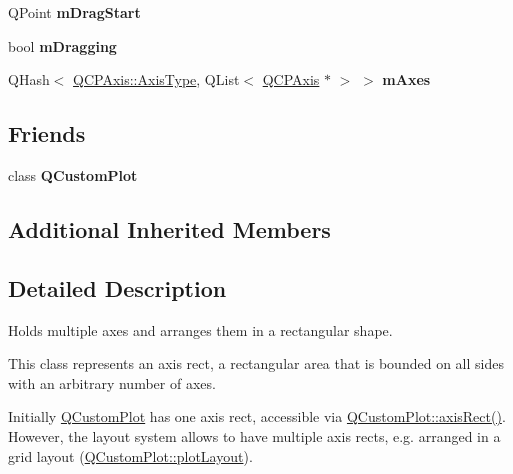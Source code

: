 \begin{DoxyCompactItemize}
\item 
Q\+Point {\bfseries m\+Drag\+Start}\hypertarget{classQCPAxisRect_a032896b28f83a58010d8d533b78c49df}{}\label{classQCPAxisRect_a032896b28f83a58010d8d533b78c49df}

\item 
bool {\bfseries m\+Dragging}\hypertarget{classQCPAxisRect_ab49a6698194cf0e9e38a1d734c0888a8}{}\label{classQCPAxisRect_ab49a6698194cf0e9e38a1d734c0888a8}

\item 
Q\+Hash$<$ \hyperlink{classQCPAxis_ae2bcc1728b382f10f064612b368bc18a}{Q\+C\+P\+Axis\+::\+Axis\+Type}, Q\+List$<$ \hyperlink{classQCPAxis}{Q\+C\+P\+Axis} $\ast$ $>$ $>$ {\bfseries m\+Axes}\hypertarget{classQCPAxisRect_afe7a24d2a2bea98fc552fa826350ba81}{}\label{classQCPAxisRect_afe7a24d2a2bea98fc552fa826350ba81}

\end{DoxyCompactItemize}
\subsection*{Friends}
\begin{DoxyCompactItemize}
\item 
class {\bfseries Q\+Custom\+Plot}\hypertarget{classQCPAxisRect_a1cdf9df76adcfae45261690aa0ca2198}{}\label{classQCPAxisRect_a1cdf9df76adcfae45261690aa0ca2198}

\end{DoxyCompactItemize}
\subsection*{Additional Inherited Members}


\subsection{Detailed Description}
Holds multiple axes and arranges them in a rectangular shape. 

This class represents an axis rect, a rectangular area that is bounded on all sides with an arbitrary number of axes.

Initially \hyperlink{classQCustomPlot}{Q\+Custom\+Plot} has one axis rect, accessible via \hyperlink{classQCustomPlot_a4a37a1add5fe63060ac518cf0a4c4050}{Q\+Custom\+Plot\+::axis\+Rect()}. However, the layout system allows to have multiple axis rects, e.\+g. arranged in a grid layout (\hyperlink{classQCustomPlot_afd280d4d621ae64a106543a545c508d7}{Q\+Custom\+Plot\+::plot\+Layout}).

